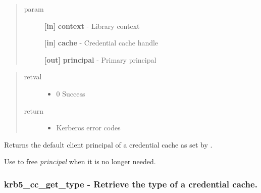 \documentclass[letterpaper,10pt,english]{sphinxmanual}
\begin{document}
\begin{quote}\begin{description}
\item[{param}] \leavevmode
\textbf{{[}in{]}} \textbf{context} - Library context

\textbf{{[}in{]}} \textbf{cache} - Credential cache handle

\textbf{{[}out{]}} \textbf{principal} - Primary principal

\end{description}\end{quote}
\begin{quote}\begin{description}
\item[{retval}] \leavevmode\begin{itemize}
\item {} 
0   Success

\end{itemize}

\item[{return}] \leavevmode\begin{itemize}
\item {} 
Kerberos error codes

\end{itemize}

\end{description}\end{quote}

Returns the default client principal of a credential cache as set by {\hyperref[appdev/refs/api/krb5_cc_initialize:c.krb5_cc_initialize]{}} .

Use {\hyperref[appdev/refs/api/krb5_free_principal:c.krb5_free_principal]{}} to free \emph{principal} when it is no longer needed.


\subsubsection{krb5\_cc\_get\_type -  Retrieve the type of a credential cache.}
\label{appdev/refs/api/krb5_cc_get_type:krb5-cc-get-type-retrieve-the-type-of-a-credential-cache}\label{appdev/refs/api/krb5_cc_get_type::doc}

\begin{fulllineitems}
\label{appdev/refs/api/krb5_cc_get_type:c.krb5_cc_get_type}
\end{fulllineitems}
\end{document}

